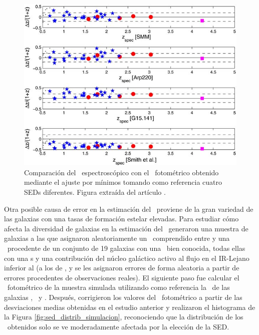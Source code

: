 \begin{figure}[htb]
    \begin{center}
         \includegraphics[width=14cm]{3_Redshift_Hatlas/apj404107f3_lr.jpg}
    \end{center}
    \vspace{-5mm}
    \caption{\small Comparación del \rt\ espectroscópico con el \rt\ fotométrico obtenido mediante el ajuste por mínimos tomando como referencia cuatro SEDs diferentes. Figura extraída del artículo \cite{article:Lapi_2011}.} 
    \label{fig:redshift_comparacion}
\end{figure}

Otra posible causa de error en la estimación del \rt\ proviene de la gran variedad de las galaxias con una tasas de formación estelar elevadas. Para estudiar cómo afecta la diversidad de galaxias en la estimación del \rt\ generaron una muestra de  galaxias a las que asignaron aleatoriamente un \rt\ comprendido entre  y una \sed\ procedente de un conjunto de 19 galaxias con una \sed\ bien conocida, todas ellas con una \sfr s \maths{\geqslant\,} y una contribución del núcleo galáctico activo al flujo en el IR-Lejano inferior al  (a los  de ,  y  se les asignaron errores de forma aleatoria a partir de errores procedentes de observaciones reales). 
El siguiente paso fue calcular el \rt\ fotométrico de la muestra simulada utilizando como referencia la \sed\ de las galaxias \arp, \gquince\ y \smm. Después, corrigieron los valores del \rt\ fotométrico a partir de las desviaciones medias obtenidas en el estudio anterior y realizaron el histograma de la Figura \ref{fig:sed_distrib_simulacion}, reconociendo que la distribución de los \rts\ obtenidos solo se ve moderadamente afectada por la elección de la SED.

